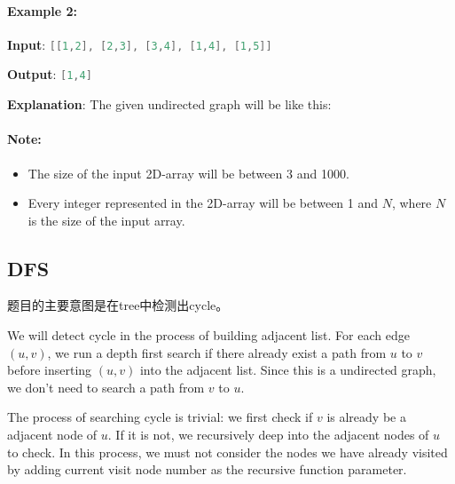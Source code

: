 \paragraph{Example 2:}
\begin{flushleft}


\textbf{Input}: \lstinline[language=C++, basicstyle=\small\ttfamily, keywordstyle=\bfseries\color{green!40!black}]|[[1,2], [2,3], [3,4], [1,4], [1,5]]|

\textbf{Output}: \lstinline[language=C++, basicstyle=\small\ttfamily, keywordstyle=\bfseries\color{green!40!black}]|[1,4]|

\textbf{Explanation}: The given undirected graph will be like this:
\begin{figure}[H]
\end{figure}
\end{flushleft}

\paragraph{Note:}
\begin{itemize}
\item The size of the input 2D-array will be between 3 and 1000.
\item Every integer represented in the 2D-array will be between 1 and $N$, where $N$ is the size of the input array.
\end{itemize}

\subsection{DFS}
题目的主要意图是在tree中检测出cycle。

We will detect cycle in the process of building adjacent list. For each edge $(u,v)$, we run a depth first search if there already exist a path from $u$ to $v$ before inserting $(u,v)$ into the adjacent list. Since this is a undirected graph, we don't need to search a path from $v$ to $u$.

The process of searching cycle is trivial: we first check if $v$ is already be a adjacent node of $u$. If it is not, we recursively deep into the adjacent nodes of $u$ to check. In this process, we must not consider the nodes we have already visited by adding current visit node number as the recursive function parameter.

